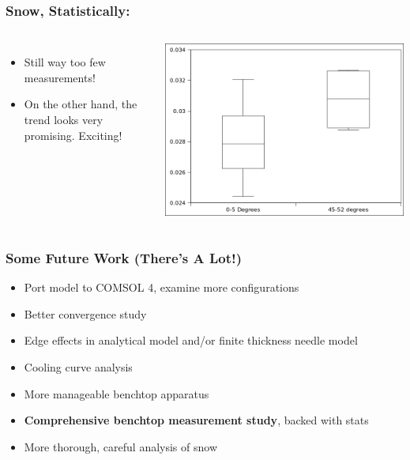 \documentclass{beamer}
\begin{document}
\begin{frame}
\frametitle{Snow, Statistically:}
\begin{columns}[c]
    \begin{itemize}
    \item Still way too few measurements!
    \item On the other hand, the trend looks very promising. Exciting!
    \end{itemize}
    \includegraphics[width=\textwidth]{fig/snow_meas_boxplot.png}
\end{columns}
\end{frame}


\begin{frame}
\frametitle{Some Future Work (There's A Lot!)}
\begin{itemize}
\item Port model to COMSOL 4, examine more configurations
\item Better convergence study
\item Edge effects in analytical model and/or finite thickness needle model
\item Cooling curve analysis
\item More manageable benchtop apparatus
\item \textbf{Comprehensive benchtop measurement study}, backed with stats
\item More thorough, careful analysis of snow
\end{itemize}
\end{frame}
\end{document}
